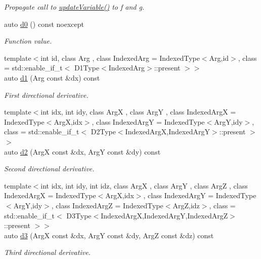 \begin{DoxyCompactItemize}
\begin{DoxyCompactList}\small\item\em Propagate call to \hyperlink{structRFFGen_1_1MathematicalOperations_1_1Product_ade58e75205d33ba03780b934e4b379c3}{update\-Variable()} to f and g. \end{DoxyCompactList}\item 
\hypertarget{structRFFGen_1_1MathematicalOperations_1_1Product_a7418270e2b7e568975254ec0feddda57}{auto \hyperlink{structRFFGen_1_1MathematicalOperations_1_1Product_a7418270e2b7e568975254ec0feddda57}{d0} () const noexcept}\label{structRFFGen_1_1MathematicalOperations_1_1Product_a7418270e2b7e568975254ec0feddda57}

\begin{DoxyCompactList}\small\item\em Function value. \end{DoxyCompactList}\item 
{\footnotesize template$<$int id, class Arg , class Indexed\-Arg  = Indexed\-Type$<$\-Arg,id$>$, class  = std\-::enable\-\_\-if\-\_\-t$<$ D1\-Type$<$\-Indexed\-Arg$>$\-::present $>$$>$ }\\auto \hyperlink{structRFFGen_1_1MathematicalOperations_1_1Product_a931ee710bfb4efa05a2dcc3182b450c5}{d1} (Arg const \&dx) const 
\begin{DoxyCompactList}\small\item\em First directional derivative. \end{DoxyCompactList}\item 
{\footnotesize template$<$int idx, int idy, class Arg\-X , class Arg\-Y , class Indexed\-Arg\-X  = Indexed\-Type$<$\-Arg\-X,idx$>$, class Indexed\-Arg\-Y  = Indexed\-Type$<$\-Arg\-Y,idy$>$, class  = std\-::enable\-\_\-if\-\_\-t$<$ D2\-Type$<$\-Indexed\-Arg\-X,\-Indexed\-Arg\-Y$>$\-::present $>$$>$ }\\auto \hyperlink{structRFFGen_1_1MathematicalOperations_1_1Product_a467d662ec3a47475a83d2e3c8ed002e3}{d2} (Arg\-X const \&dx, Arg\-Y const \&dy) const 
\begin{DoxyCompactList}\small\item\em Second directional derivative. \end{DoxyCompactList}\item 
{\footnotesize template$<$int idx, int idy, int idz, class Arg\-X , class Arg\-Y , class Arg\-Z , class Indexed\-Arg\-X  = Indexed\-Type$<$\-Arg\-X,idx$>$, class Indexed\-Arg\-Y  = Indexed\-Type$<$\-Arg\-Y,idy$>$, class Indexed\-Arg\-Z  = Indexed\-Type$<$\-Arg\-Z,idz$>$, class  = std\-::enable\-\_\-if\-\_\-t$<$ D3\-Type$<$\-Indexed\-Arg\-X,\-Indexed\-Arg\-Y,\-Indexed\-Arg\-Z$>$\-::present $>$$>$ }\\auto \hyperlink{structRFFGen_1_1MathematicalOperations_1_1Product_a155fb5653aeaf258dc4e23e8ccb734b3}{d3} (Arg\-X const \&dx, Arg\-Y const \&dy, Arg\-Z const \&dz) const 
\begin{DoxyCompactList}\small\item\em Third directional derivative. \end{DoxyCompactList}\end{DoxyCompactItemize}


